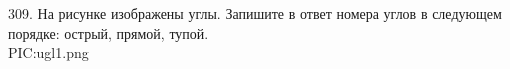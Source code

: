 309. На рисунке изображены углы. Запишите в ответ номера углов в следующем порядке: острый, прямой, тупой.\\
{{PIC:ugl1.png}}\\
